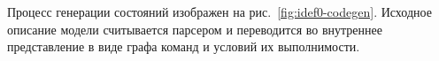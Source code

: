 Процесс генерации состояний изображен на рис.~\ref{fig:idef0-codegen}. Исходное описание
модели считывается парсером и переводится во внутреннее представление в виде графа команд
и условий их выполнимости. 



